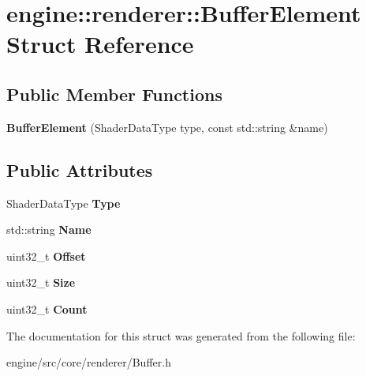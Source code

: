 \hypertarget{structengine_1_1renderer_1_1BufferElement}{}\section{engine\+:\+:renderer\+:\+:Buffer\+Element Struct Reference}
\label{structengine_1_1renderer_1_1BufferElement}
\subsection*{Public Member Functions}
\begin{DoxyCompactItemize}
\item
\mbox{\label{structengine_1_1renderer_1_1BufferElement_afcfba21a475250f0ef5f002893b2ebb0}}
{\bfseries Buffer\+Element} (Shader\+Data\+Type type, const std\+::string \&name)
\end{DoxyCompactItemize}
\subsection*{Public Attributes}
\begin{DoxyCompactItemize}
\item
\mbox{\label{structengine_1_1renderer_1_1BufferElement_ad15963c4b3ba16476cce390f77bcb549}}
Shader\+Data\+Type {\bfseries Type}
\item
\mbox{\label{structengine_1_1renderer_1_1BufferElement_a4d15f927313a59f54d234c435a254fb8}}
std\+::string {\bfseries Name}
\item
\mbox{\label{structengine_1_1renderer_1_1BufferElement_acbe3158f166940f1b6a0c9f1add6e028}}
uint32\+\_\+t {\bfseries Offset}
\item
\mbox{\label{structengine_1_1renderer_1_1BufferElement_aa56181d65756cf32e9c3957bad71c2c1}}
uint32\+\_\+t {\bfseries Size}
\item
\mbox{\label{structengine_1_1renderer_1_1BufferElement_ab87e87069a1ef81d4b115b9407b46de5}}
uint32\+\_\+t {\bfseries Count}
\end{DoxyCompactItemize}


The documentation for this struct was generated from the following file\+:\begin{DoxyCompactItemize}
\item
engine/src/core/renderer/Buffer.\+h\end{DoxyCompactItemize}
